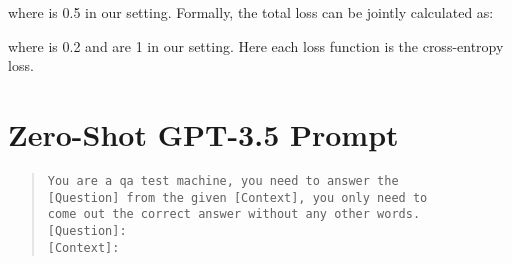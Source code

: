 \documentclass[10.5pt]{article}
\begin{document}
where  is 0.5 in our setting. Formally, the total loss  can be jointly calculated as:


where  is 0.2 and  are 1 in our setting. Here each loss function is the cross-entropy loss.

\section{Zero-Shot GPT-3.5 Prompt}\label{appendix_b}
\begin{quote}\begin{scriptsize}\begin{verbatim}
You are a qa test machine, you need to answer the 
[Question] from the given [Context], you only need to 
come out the correct answer without any other words.
[Question]:
[Context]:
\end{verbatim}\end{scriptsize}\end{quote}
\end{document}
